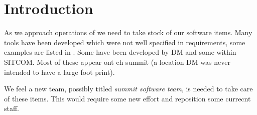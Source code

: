 \section{Introduction} \label{sec:intro}
As we approach operations of \VRO we need to take stock of our \gls{software} items.
Many tools have been developed which were not well specified in requirements, some examples are listed in .
Some have been developed by \gls{DM} and some within \gls{SITCOM}.
Most of these appear ont eh summit (a location \gls{DM} was never intended to have a large foot print).


We feel a new team, possibly titled \emph{summit software team}, is needed to take care of these items.
This would require some new effort and reposition some currecnt staff.
